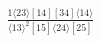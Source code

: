 \documentclass[varwidth, border=5pt]{standalone}
\begin{document}
\begin{my}
$\begin{gathered}
\scriptscriptstyle\frac{1⟨23⟩[14][34]⟨14⟩}{⟨13⟩^2[15]⟨24⟩[25]}
\end{gathered}$
\end{my}
\end{document}
